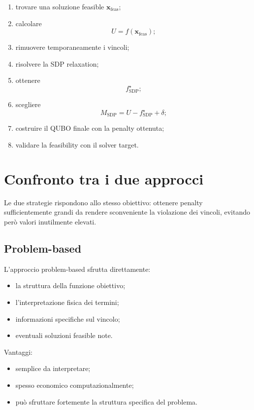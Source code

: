 \documentclass[11pt,a4paper]{report}
\begin{document}
\begin{enumerate}
    \item trovare una soluzione feasible $\mathbf x_{\mathrm{feas}}$;
    \item calcolare
    \[
    U=f(\mathbf x_{\mathrm{feas}});
    \]
    \item rimuovere temporaneamente i vincoli;
    \item risolvere la SDP relaxation;
    \item ottenere
    \[
    f^\star_{\mathrm{SDP}};
    \]
    \item scegliere
    \[
    M_{\mathrm{SDP}}
    =
    U-f^\star_{\mathrm{SDP}}+\delta;
    \]
    \item costruire il QUBO finale con la penalty ottenuta;
    \item validare la feasibility con il solver target.
\end{enumerate}

\chapter{Confronto tra i due approcci}

Le due strategie rispondono allo stesso obiettivo: ottenere penalty
sufficientemente grandi da rendere sconveniente la violazione dei
vincoli, evitando però valori inutilmente elevati.

\section{Problem-based}

L'approccio problem-based sfrutta direttamente:

\begin{itemize}
    \item la struttura della funzione obiettivo;
    \item l'interpretazione fisica dei termini;
    \item informazioni specifiche sul vincolo;
    \item eventuali soluzioni feasible note.
\end{itemize}

Vantaggi:

\begin{itemize}
    \item semplice da interpretare;
    \item spesso economico computazionalmente;
    \item può sfruttare fortemente la struttura specifica del problema.
\end{itemize}
\end{document}
